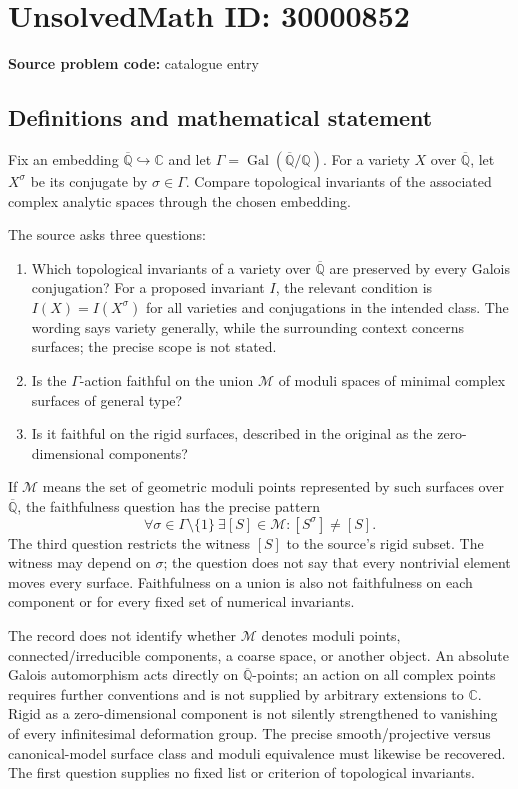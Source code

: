 \documentclass[11pt]{article}
\newcommand{\Q}{\mathbb{Q}}
\newcommand{\C}{\mathbb{C}}
\begin{document}
\section*{UnsolvedMath ID: 30000852}
\textbf{Source problem code:} catalogue entry
\subsection{Definitions and mathematical statement}
Fix an embedding $\overline{\Q}\hookrightarrow\C$ and let $\Gamma=\operatorname{Gal}(\overline{\Q}/\Q)$. For a variety $X$ over $\overline{\Q}$, let $X^\sigma$ be its conjugate by $\sigma\in\Gamma$. Compare topological invariants of the associated complex analytic spaces through the chosen embedding.

The source asks three questions:
\begin{enumerate}
\item Which topological invariants of a variety over $\overline{\Q}$ are preserved by every Galois conjugation? For a proposed invariant $I$, the relevant condition is $I(X)=I(X^\sigma)$ for all varieties and conjugations in the intended class. The wording says variety generally, while the surrounding context concerns surfaces; the precise scope is not stated.
\item Is the $\Gamma$-action faithful on the union $\mathcal M$ of moduli spaces of minimal complex surfaces of general type?
\item Is it faithful on the rigid surfaces, described in the original as the zero-dimensional components?
\end{enumerate}

If $\mathcal M$ means the set of geometric moduli points represented by such surfaces over $\overline{\Q}$, the faithfulness question has the precise pattern
\[
 \forall\sigma\in\Gamma\setminus\{1\}\ \exists[S]\in\mathcal M:
                      [S^\sigma]\ne[S].
\]
The third question restricts the witness $[S]$ to the source's rigid subset. The witness may depend on $\sigma$; the question does not say that every nontrivial element moves every surface. Faithfulness on a union is also not faithfulness on each component or for every fixed set of numerical invariants.

The record does not identify whether $\mathcal M$ denotes moduli points, connected/irreducible components, a coarse space, or another object. An absolute Galois automorphism acts directly on $\overline{\Q}$-points; an action on all complex points requires further conventions and is not supplied by arbitrary extensions to $\C$. Rigid as a zero-dimensional component is not silently strengthened to vanishing of every infinitesimal deformation group. The precise smooth/projective versus canonical-model surface class and moduli equivalence must likewise be recovered. The first question supplies no fixed list or criterion of topological invariants.
\end{document}

